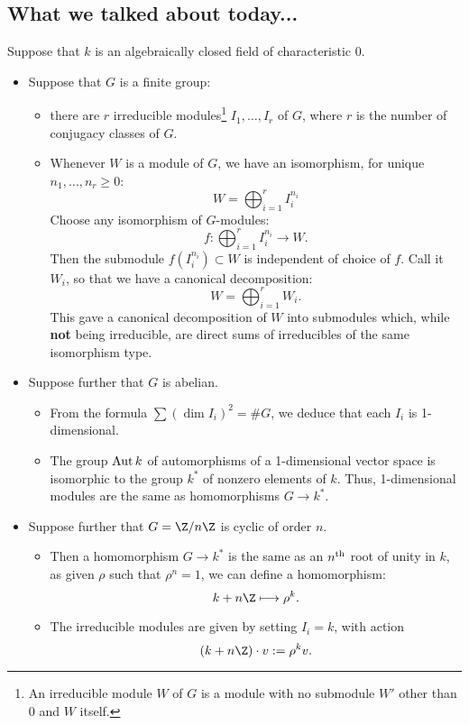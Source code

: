 \documentclass[11pt]{article}
\begin{document}
\begin{Minseon Chat on Rep thy}
\subsection*{What we talked about today...}
Suppose that $k$ is an algebraically closed field of characteristic 0.
\begin{itemize}\squishlist
\item  Suppose that $G$ is a finite group:
\begin{itemize}\squishlist

\item there are $r$ irreducible modules\footnote{An irreducible module $W$ of $G$ is a module with no submodule $W'$ other than $0$ and $W$ itself.} $I_1,\ldots,I_r$ of $G$, where $r$ is the number of conjugacy classes of $G$.
\item Whenever $W$ is a module of $G$, we have an isomorphism, for unique $n_1,\ldots,n_r\geq0$:
\[W=\bigoplus_{i=1}^{r}I_i^{n_i}\]
Choose any isomorphism of $G$-modules:
\[f:\bigoplus_{i=1}^{r}I_i^{n_i}\to W.\]
Then the submodule $f(I_i^{n_i})\subset W$ is independent of choice of $f$. Call it $W_i$, so that we have a canonical decomposition:
\[W=\bigoplus_{i=1}^{r}W_i.\]
This gave a canonical decomposition of $W$ into submodules which, while \textbf{not} being irreducible, are direct sums of irreducibles of the same isomorphism type.
\end{itemize}
\item Suppose further that $G$ is abelian. 
\begin{itemize}\squishlist
\item From the formula $\sum(\dim I_i)^2=\# G$, we deduce that each $I_i$ is 1-dimensional.
\item The group $\operatorname{Aut} k$ of automorphisms of a 1-dimensional vector space is isomorphic to the group $k^*$ of nonzero elements of $k$.
 Thus, 1-dimensional modules are the same as homomorphisms $G\to k^*$.
\end{itemize}
\item Suppose further that $G=\Z/n\Z$ is cyclic of order $n$.
\begin{itemize}\squishlist
\item Then a homomorphism $G\to k^*$ is the same as an $n^\textup{th}$ root of unity in $k$, as given $\rho$ such that $\rho^n=1$, we can define a homomorphism:
\[k+n\Z\mapsto \rho^k.\]
\item The irreducible modules are given by setting $I_i=k$, with action
\[(k+n\Z)\cdot v:=\rho^kv.\]

\end{itemize}
\end{itemize}
\end{Minseon Chat on Rep thy}
\end{document}
